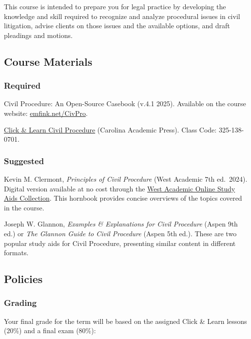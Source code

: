 \documentclass[11pt,letterpaper,twoside]{article}
\begin{document}
This course is intended to prepare you for legal practice by developing
the knowledge and skill required to recognize and analyze procedural
issues in civil litigation, advise clients on those issues and the
available options, and draft pleadings and motions.

\subsection{Course Materials}\label{course-materials}

\subsubsection{Required}\label{required}

Civil Procedure: An Open-Source Casebook (v.4.1 2025). Available on the
course website:
\href{https://www.emfink.net/CivPro/}{emfink.net/CivPro}.

\href{https://clickandlearnguide.com}{Click \& Learn Civil Procedure}
(Carolina Academic Press). Class Code: 325-138-0701.

\subsubsection{Suggested}\label{suggested}

Kevin M. Clermont, \emph{Principles of Civil Procedure} (West Academic
7th ed.~2024). Digital version available at no cost through the
\href{https://subscription.westacademic.com/}{West Academic Online Study
Aids Collection}. This hornbook provides concise overviews of the topics
covered in the course.

Joseph W. Glannon, \emph{Examples \& Explanations for Civil Procedure}
(Aspen 9th ed.) or \emph{The Glannon Guide to Civil Procedure} (Aspen
5th ed.). These are two popular study aids for Civil Procedure,
presenting similar content in different formats.

\subsection{Policies}\label{policies}

\subsubsection{Grading}\label{grading}

Your final grade for the term will be based on the assigned Click \&
Learn lessons (20\%) and a final exam (80\%):
\end{document}
